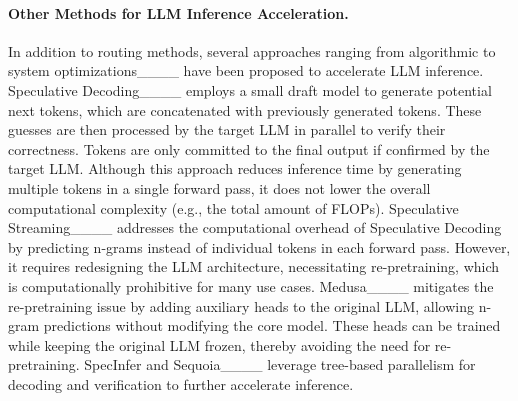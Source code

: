 \paragraph{Other Methods for LLM Inference Acceleration.}
In addition to routing methods, several approaches ranging from algorithmic to system optimizations____ have been proposed to accelerate LLM inference. Speculative Decoding____ employs a small draft model to generate potential next tokens, which are concatenated with previously generated tokens. These guesses are then processed by the target LLM in parallel to verify their correctness. Tokens are only committed to the final output if confirmed by the target LLM. Although this approach reduces inference time by generating multiple tokens in a single forward pass, it does not lower the overall computational complexity (e.g., the total amount of FLOPs). Speculative Streaming____ addresses the computational overhead of Speculative Decoding by predicting n-grams instead of individual tokens in each forward pass. However, it requires redesigning the LLM architecture, necessitating re-pretraining, which is computationally prohibitive for many use cases. Medusa____ mitigates the re-pretraining issue by adding auxiliary heads to the original LLM, allowing n-gram predictions without modifying the core model. These heads can be trained while keeping the original LLM frozen, thereby avoiding the need for re-pretraining. SpecInfer and Sequoia____ leverage tree-based parallelism for decoding and verification to further accelerate inference.

\vspace{-1em}